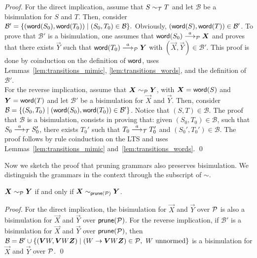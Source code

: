 \begin{proof}
For the direct implication, assume that $S \sim_\mathcal T T$ and let
$\mathcal{B}$ be a bisimulation for $S$ and $T$. Then, consider 
$ \mathcal{B}' = 
\{(\mathsf{word} (S_0), \mathsf{word}(T_0))\mid (S_0,T_0)\in \mathcal{B} \}. $
Obviously, $(\mathsf{word}(S), \mathsf{word}(T))\in \mathcal{B}'$. To prove that
$\mathcal{B}'$ is a bisimulation, one assumes that 
$\word (S_0)\LTSderivesP \vec X $ and proves that there exists
$\vec Y$ such that $\word (T_0)\LTSderivesP \vec Y $
with $(\vec X, \vec Y)\in \mathcal{B}'$. This proof  
is done by coinduction on the definition of $\mathsf{word}$, uses 
Lemmas~\ref{lem:transitions_mimic}, \ref{lem:transitions_words},
and the definition of $\mathcal{B}'$. \smallskip\\
For the reverse implication, assume that 
$\vec X \ProdEquiv \vec Y$, with $\vec X = \word (S)$ and
$\vec Y = \word(T)$ and let $\mathcal{B}'$ be a bisimulation
for $\vec X$ and $\vec Y$. Then, consider
$\mathcal{B} = \{(S_0, T_0)\mid (\mathsf{word}(S_0),\mathsf{word}(T_0))\in \mathcal{B}'\}$.
Notice that $(S,T)\in \mathcal{B}$.
The proof that $\mathcal{B}$ is a bisimulation, consists in proving that:
given $(S_0, T_0)\in \mathcal{B}$, such that $S_0\stackrel{a}{\longrightarrow}_\mathcal T S_0'$,
there exists $T_0'$ such that $T_0\stackrel{a}{\longrightarrow}_\mathcal T T_0'$
and $(S_0',T_0')\in \mathcal{B}$. The proof
follows by rule coinduction on the LTS and uses 
Lemmas~\ref{lem:transitions_mimic} and~\ref{lem:transitions_words}. \qed 
\end{proof}

Now we sketch the proof that pruning grammars also preserves bisimulation.
We distinguish the grammars in the context through the subscript of $\sim$.

\begin{theorem}
	\label{thm:pruning_preserves_bisim}
	$\vec X \bisimP \vec Y$ if and only if $\vec X \sim_{\Prune(\productions)} \vec Y$.
\end{theorem}

\begin{proof}
For the direct implication, the bisimulation for $\vec X$ and $\vec Y$ over
$\mathcal P$ is also a bisimulation for $\vec X$ and $\vec Y$ over
$\mathsf{prune}(\mathcal P)$. For the reverse implication, if $\mathcal{B}'$
is a bisimulation for $\vec X$ and $\vec Y$ over $\mathsf{prune}(\mathcal P)$,
then $\mathcal{B} = \mathcal{B}' \cup 
\{(\vec V W, \vec V W \vec Z) \mid  (W\rightarrow \vec V W \vec Z) \in \productions, 
\text{ $W$ unnormed} \}$ 
is a bisimulation for $\vec X$ and $\vec Y$ over $\mathcal P$. \qed
\end{proof}


